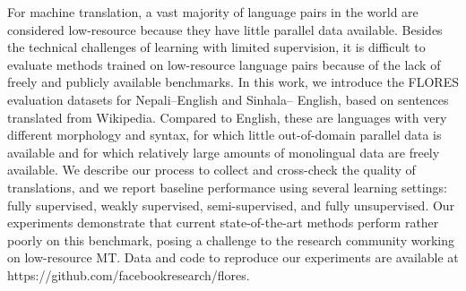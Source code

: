 For machine translation, a vast majority of language pairs in the world are considered
low-resource because they have little parallel data available. Besides the technical challenges of learning with limited supervision, it is difficult to evaluate methods trained on low-resource language pairs because of the lack of freely and publicly available benchmarks. In this work, we introduce the FLORES evaluation datasets for Nepali–English and Sinhala–
English, based on sentences translated from Wikipedia. Compared to English, these are languages with very different morphology and syntax, for which little out-of-domain parallel data is available and for which relatively large amounts of monolingual data are freely available. We describe our process to collect and cross-check the quality of translations,
and we report baseline performance using several learning settings: fully supervised, weakly supervised, semi-supervised, and fully unsupervised. Our experiments demonstrate that current state-of-the-art methods perform rather poorly on this benchmark, posing a challenge to the research community working on low-resource MT. Data and code to reproduce our
experiments are available at https://github.com/facebookresearch/flores.